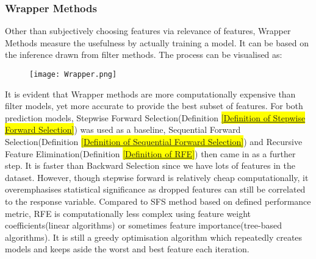 \subsubsection{Wrapper Methods}
Other than subjectively choosing features via relevance of features, Wrapper Methods measure the usefulness by actually training a model. It can be based on the inference drawn from filter methods. The process can be visualised as:
 \begin{figure}[H]
  \centering
  \texttt{[image: Wrapper.png]}
\end{figure}
It is evident that Wrapper methods are more computationally expensive than filter models, yet more accurate to provide the best subset of features. For both prediction models, Stepwise Forward Selection(Definition \hl{\ref{Definition of Stepwise Forward Selection}}) was used as a baseline, Sequential Forward Selection(Definition \hl{\ref{Definition of Sequential Forward Selection}}) and Recursive Feature Elimination(Definition \hl{\ref{Definition of RFE}}) then came in as a further step. It is faster than Backward Selection since we have lots of features in the dataset. However, though stepwise forward is relatively cheap computationally, it overemphasises statistical significance as dropped features can still be correlated to the response variable. Compared to SFS method based on defined performance metric, RFE is computationally less complex using feature weight coefficients(linear algorithms) or sometimes feature importance(tree-based algorithms). It is still a greedy optimisation algorithm which repeatedly creates models and keeps aside the worst and best feature each iteration. 
